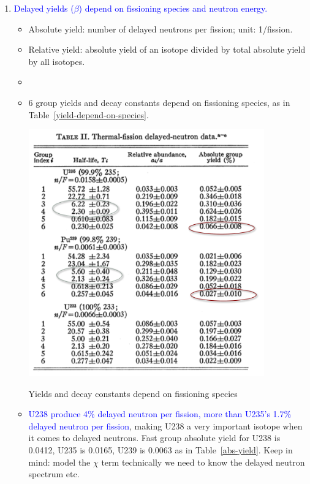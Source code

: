 \documentclass{school-22.211-notes}
\begin{document}
\begin{enumerate}
\item  \textcolor{blue}{Delayed yields ($\beta$) depend on fissioning species and neutron energy.}
  \begin{itemize}
  \item Absolute yield: number of delayed neutrons per fission; unit: 1/fission. 
  \item Relative yield: absolute yield of an isotope divided by total absolute yield by all isotopes. 
  \item {}
  \item 6 group yields and decay constants depend on fissioning species, as in Table~\ref{yield-depend-on-species}.
    \begin{table}[ht]
      \centering
      \includegraphics[width=4in]{images/pke/yield-depend-on-species.png}
      \caption{Yields and decay constants depend on fissioning species} \label{yield-depend-on-species}
    \end{table}
  \item \textcolor{blue}{U238 produce 4\% delayed neutron per fission, more than U235's 1.7\% delayed neutron per fission}, making U238 a very important isotope when it comes to delayed neutrons. Fast group absolute yield for U238 is 0.0412, U235 is 0.0165, U239 is 0.0063 as in Table~\ref{abs-yield}. Keep in mind:  model the $\chi$ term technically we need to know the delayed neutron spectrum etc. 
  \end{itemize}

\end{enumerate}
\end{document}
